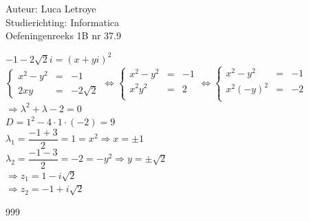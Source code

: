 \documentclass[a4paper]{article}
\begin{document}
  
\noindent \large Auteur: Luca Letroye \\
\noindent \large Studierichting: Informatica\\
\noindent \large Oefeningenreeks 1B nr 37.9\\

\medskip

\normalsize

$-1-2\sqrt{2}i = (x+yi)^2$\\

$
\left\{
    \begin{array}{lll} 
        x^2 - y^2 &=& -1\\
        2xy &=& -2\sqrt{2}
    \end{array}
\right.
\Leftrightarrow
\left\{
    \begin{array}{lll} 
        x^2 - y^2 &=& -1\\
        x^2y^2 &=& 2\\
    \end{array}
\right.
\Leftrightarrow
\left\{
    \begin{array}{lll} 
        x^2 - y^2 &=& -1\\
        x^2(-y)^2 &=& -2\\
    \end{array}
\right.
$\\

$\Rightarrow \lambda^2 + \lambda - 2 = 0$\\

$D = 1^2 - 4 \cdot 1 \cdot (-2) = 9$\\

$\lambda_1 = \dfrac{-1+3}{2} = 1 = x^2 \Rightarrow x = \pm 1$\\

$\lambda_2 = \dfrac{-1-3}{2} = -2 = -y^2 \Rightarrow y = \pm \sqrt{2}$\\

$\Rightarrow z_1 = 1-i\sqrt{2}$\\

$\Rightarrow z_2 = -1+i\sqrt{2}$




\begin{thebibliography}{999}
\end{thebibliography}
\end{document}
